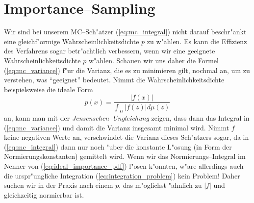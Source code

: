 	\section{Importance--Sampling}\label{subsec:importancesampling}
	Wir sind bei unserem MC--Sch"atzer (\ref{eq:mc_integral}) nicht darauf beschr"ankt eine gleich\-f"or\-mi\-ge Wahrscheinlichkeitsdichte $p$ zu w"ahlen. Es kann die Effizienz des Verfahrens sogar betr"achtlich verbessern, wenn wir eine geeignete Wahrscheinlichkeitsdichte $p$ w"ahlen. Schauen wir uns daher die Formel (\ref{eq:mc_variance}) f"ur die Varianz, die es zu minimieren gilt, nochmal an, um zu verstehen, was ``geeignet'' bedeutet. Nimmt die Wahrscheinlichkeitsdichte beispielsweise die ideale Form
	\begin{equation}
		p(x)=\frac{|f(x)|}{\int_\Omega |f(z)|d\mu(z)}
		\label{eq:ideal_importance_pdf}
	\end{equation}
	an, kann man mit der {\em Jensenschen~Ungleichung} zeigen, dass dann das Integral in (\ref{eq:mc_variance}) und damit die Varianz insgesamt minimal wird. Nimmt $f$ keine negativen Werte an, verschwindet die Varianz dieses Sch"atzers sogar, da in (\ref{eq:mc_integral}) dann nur noch "uber die konstante L"osung (in Form der Normierungskonstanten) gemittelt wird. Wenn wir das Normierungs--Integral im Nenner von (\ref{eq:ideal_importance_pdf}) l"osen k"onnten, w"are allerdings auch die urspr"ungliche Integration (\ref{eq:integration_problem}) kein Problem! Daher suchen wir in der Praxis nach einem $p$, das m"oglichst "ahnlich zu $|f|$ und gleichzeitig normierbar ist.
	
